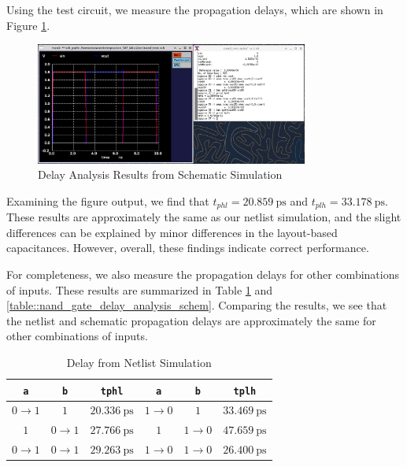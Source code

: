 \documentclass{article}
\begin{document}
	\noindent Using the test circuit, we measure the propagation delays, which are shown in Figure \ref{fig::nand_delay_analysis_schem}.
	
	\begin{figure}[H]
		\centerline{\includegraphics[width=0.8\textwidth]{nand_delay_analysis_schem.png}}
		\caption{Delay Analysis Results from Schematic Simulation}
		\label{fig::nand_delay_analysis_schem}
	\end{figure}
	
	\noindent Examining the figure output, we find that $t_{phl} = 20.859\ \text{ps}$ and $t_{plh} = 33.178\ \text{ps}$. These results are approximately the same as our netlist simulation, and the slight differences can be explained by minor differences in the layout-based capacitances. However, overall, these findings indicate correct performance.
	
	For completeness, we also measure the propagation delays for other combinations of inputs. These results are summarized in Table \ref{table::nand_gate_delay_analysis} and \ref{table::nand_gate_delay_analysis_schem}. Comparing the results, we see that the netlist and schematic propagation delays are approximately the same for other combinations of inputs.
	 
	\begin{table}[H]
	\begin{center}
	\caption{Delay from Netlist Simulation}
	\label{table::nand_gate_delay_analysis}
	\begin{tabular}{| c | c | c || c | c | c |}
		\hline
		\texttt{a} & \texttt{b} & \texttt{tphl} & \texttt{a} & \texttt{b} & \texttt{tplh} \\
		\hline	
		$0 \rightarrow 1$ & $1$ & $20.336\ \text{ps}$ & $1 \rightarrow 0$ & $1$ & $33.469\ \text{ps}$\\
		\hline	
		$1$ & $0 \rightarrow 1$ & $27.766\ \text{ps}$ & $1$ & $1 \rightarrow 0$ & $47.659\ \text{ps}$\\
		\hline	
		$0 \rightarrow 1$ & $0 \rightarrow 1$ & $29.263\ \text{ps}$ & $1 \rightarrow 0$ & $1 \rightarrow 0$ & $26.400\ \text{ps}$\\
		\hline
	\end{tabular}
	\end{center}
	\end{table}
	
\end{document}
